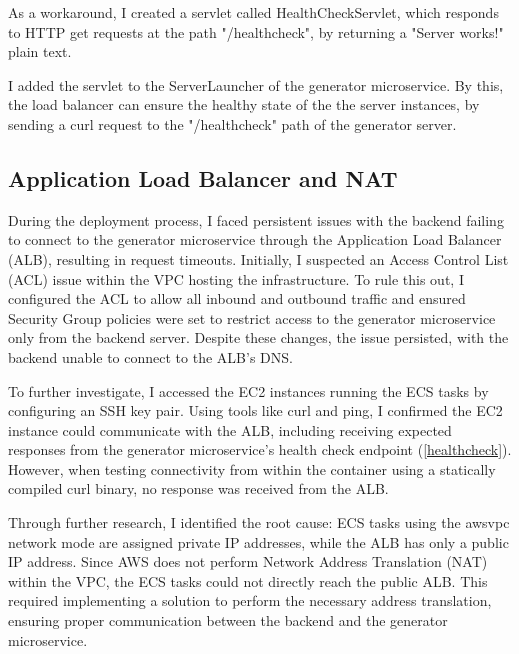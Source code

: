 		As a workaround, I created a servlet called HealthCheckServlet, which responds to HTTP get requests at the path "/healthcheck",
		by returning a "Server works!" plain text.

		I added the servlet to the ServerLauncher of the generator microservice. By this, the load balancer can ensure the healthy state of the 
		the server instances, by sending a curl request to the "/healthcheck" path of the generator server.

	\subsection{Application Load Balancer and NAT} \label{ALB NAT}
		During the deployment process, I faced persistent issues with the backend failing to connect to the generator microservice 
		through the Application Load Balancer (ALB), resulting in request timeouts. Initially, I suspected an Access Control List (ACL) 
		issue within the VPC hosting the infrastructure. To rule this out, I configured the ACL to allow all inbound and outbound traffic 
		and ensured Security Group policies were set to restrict access to the generator microservice only from the backend server. 
		Despite these changes, the issue persisted, with the backend unable to connect to the ALB's DNS.

		To further investigate, I accessed the EC2 instances running the ECS tasks by configuring an SSH key pair. 
		Using tools like curl and ping, I confirmed the EC2 instance could communicate with the ALB, including receiving expected responses 
		from the generator microservice's health check endpoint (\ref{healthcheck}). However, when testing connectivity from within the container 
		using a statically compiled curl binary, no response was received from the ALB.

		Through further research, I identified the root cause: ECS tasks using the awsvpc network mode are assigned private IP addresses, 
		while the ALB has only a public IP address. Since AWS does not perform Network Address Translation (NAT) within the VPC, 
		the ECS tasks could not directly reach the public ALB. This required implementing a solution to perform the necessary address translation, 
		ensuring proper communication between the backend and the generator microservice.

